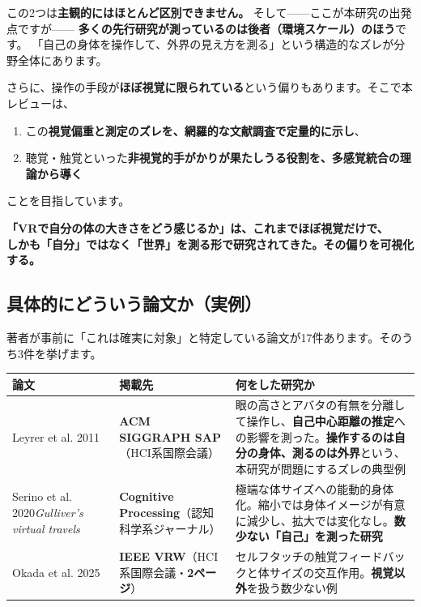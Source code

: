 \documentclass[a4paper]{ltjsarticle}
\newcommand{\keybox}[1]{%
  \par\medskip
  \noindent\colorbox{soft}{%
    \begin{minipage}{\dimexpr\linewidth-2\fboxsep\relax}
      \vspace{2pt}\centering\bfseries\large #1\vspace{4pt}
    \end{minipage}}%
  \par\medskip}
\begin{document}
\noindent
この2つは\textbf{主観的にはほとんど区別できません。} そして——ここが本研究の出発点ですが——
\textbf{多くの先行研究が測っているのは後者（環境スケール）のほう}です。
「自己の身体を操作して、外界の見え方を測る」という構造的なズレが分野全体にあります。

\medskip
\noindent
さらに、操作の手段が\textbf{ほぼ視覚に限られている}という偏りもあります。そこで本レビューは、

\begin{enumerate}[leftmargin=1.8em]
  \item この\textbf{視覚偏重と測定のズレを、網羅的な文献調査で定量的に示し}、
  \item 聴覚・触覚といった\textbf{非視覚的手がかりが果たしうる役割を、多感覚統合の理論から導く}
\end{enumerate}

\noindent
ことを目指しています。

\keybox{「VRで自分の体の大きさをどう感じるか」は、これまでほぼ視覚だけで、\\
しかも「自分」ではなく「世界」を測る形で研究されてきた。その偏りを可視化する。}

\subsection*{具体的にどういう論文か（実例）}

著者が事前に「これは確実に対象」と特定している論文が17件あります。そのうち3件を挙げます。

\begin{center}
\begin{tabularx}{\linewidth}{L{9.5em} L{10em} X}
\toprule
論文 & 掲載先 & 何をした研究か \\
\midrule
Leyrer et al. 2011
& \textbf{ACM SIGGRAPH SAP}\newline （HCI系国際会議）
& 眼の高さとアバタの有無を分離して操作し、\textbf{自己中心距離の推定}への影響を測った。\textbf{操作するのは自分の身体、測るのは外界}という、本研究が問題にするズレの典型例 \\
\addlinespace
Serino et al. 2020\newline \textit{Gulliver's virtual travels}
& \textbf{Cognitive Processing}\newline （認知科学系ジャーナル）
& 極端な体サイズへの能動的身体化。縮小では身体イメージが有意に減少し、拡大では変化なし。\textbf{数少ない「自己」を測った研究} \\
\addlinespace
Okada et al. 2025
& \textbf{IEEE VRW}\newline （HCI系国際会議\newline ・\mbox{\textbf{2ページ}}）
& セルフタッチの触覚フィードバックと体サイズの交互作用。\textbf{視覚以外}を扱う数少ない例 \\
\bottomrule
\end{tabularx}
\end{center}
\end{document}
